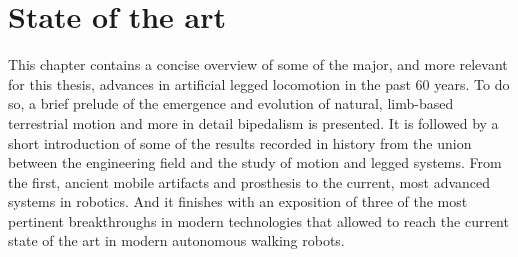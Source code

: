 \chapter{State of the art} %
\label{cha:state_of_the_art}
This chapter contains a concise overview of some of the major, and more relevant for this thesis, advances in artificial legged locomotion in the past 60 years.
To do so, a brief prelude of the emergence and evolution of natural, limb-based terrestrial motion and more in detail bipedalism is presented.
It is followed by a short introduction of some of the results recorded in history from the union between the engineering field and the study of motion and legged systems. 
From the first, ancient mobile artifacts and prosthesis to the current, most advanced systems in robotics.
And it finishes with an exposition of three of the most pertinent breakthroughs in modern technologies that allowed to reach the current state of the art in modern autonomous walking robots.





%
%





